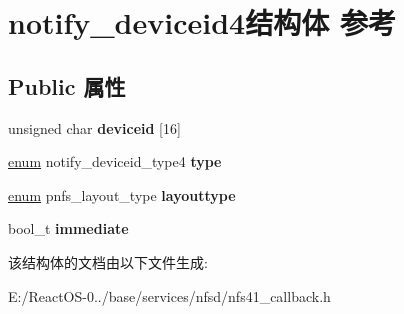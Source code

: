 \hypertarget{structnotify__deviceid4}{}\section{notify\+\_\+deviceid4结构体 参考}
\label{structnotify__deviceid4}
\subsection*{Public 属性}
\begin{DoxyCompactItemize}
\item 
\mbox{\label{structnotify__deviceid4_a61ae22ff10a199bb5e1553ec77a8b69c}} 
unsigned char {\bfseries deviceid} \mbox{[}16\mbox{]}
\item 
\mbox{\label{structnotify__deviceid4_ab9335de95681ab5e557371ebe09c944d}} 
\hyperlink{interfaceenum}{enum} notify\+\_\+deviceid\+\_\+type4 {\bfseries type}
\item 
\mbox{\label{structnotify__deviceid4_a58d44421bfdf6ac812a67897743f3f32}} 
\hyperlink{interfaceenum}{enum} pnfs\+\_\+layout\+\_\+type {\bfseries layouttype}
\item 
\mbox{\label{structnotify__deviceid4_ac4eee859a5acbbca63359869e7e03f85}} 
bool\+\_\+t {\bfseries immediate}
\end{DoxyCompactItemize}


该结构体的文档由以下文件生成\+:\begin{DoxyCompactItemize}
\item 
E\+:/\+React\+O\+S-\/0../base/services/nfsd/nfs41\+\_\+callback.\+h\end{DoxyCompactItemize}
